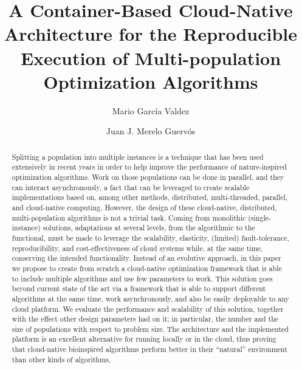 \documentclass[review]{elsarticle}
\begin{document}
\lstset{language=Python} 
\begin{frontmatter}

\title{A Container-Based Cloud-Native Architecture for the Reproducible Execution of Multi-population Optimization Algorithms}

\author[itt]{Mario Garc\'ia Valdez}

\author[granada]{Juan J. Merelo Guerv\'os}

\address[itt]{Department of Graduate Studies, Instituto Tecnol\'ogico de Tijuana, Tijuana BC, Mexico}
\address[granada]{Department of Computer Architecture and Technology, Universidad de Granada, Granada, Spain}

\begin{abstract} 
Splitting a population into multiple instances is a technique that has
been used extensively in recent years in order to help improve the
performance of nature-inspired optimization algorithms. Work on those
populations can be done in parallel, and they can interact asynchronously,
a fact that can be leveraged to create scalable implementations based
on, among other methods, distributed, multi-threaded, parallel, and
cloud-native computing.  However, the design of these cloud-native,
distributed, multi-population algorithms is not a trivial task. Coming
from monolithic (single-instance) solutions, adaptations at several
levels, from the algorithmic to the functional, must be made to
leverage the scalability, elasticity, (limited) fault-tolerance,
reproducibility, and cost-effectiveness of cloud systems while, at the
same time, conserving the intended functionality. Instead of an
evolutive approach, in this paper we propose to create from scratch a
cloud-native optimization framework that is able to include multiple
algorithms and use few parameters to work. This solution goes beyond
current state of the art via a framework that is able to support
different algorithms at the same time, work asynchronously, and also
be easily deployable to any cloud platform. We evaluate the
performance and scalability of this solution, together with the effect
other design parameters had on it; in particular, the number and the
size of populations with respect to problem size. The architecture and
the implemented platform is an excellent alternative for running
locally or in the cloud, thus proving that cloud-native bioinspired
algorithms perform better in their ``natural'' environment than other
kinds of algorithms, %


\end{abstract}
\end{frontmatter}
\end{document}
